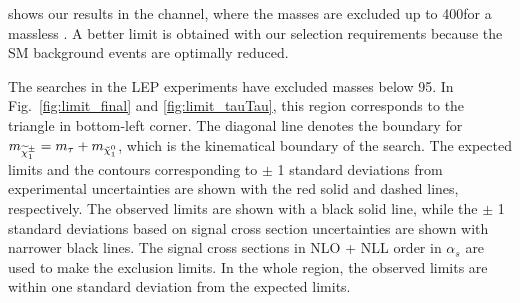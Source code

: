 shows our results in the \tauTau channel, where the \chione masses are excluded up to 400\GeV for a massless \PSGczDo. 
A better limit is obtained with our selection requirements because the SM background events are optimally reduced.

The \sTau searches in the LEP experiments \cite{lepsusy} have excluded masses below 95\GeV. In Fig.~\ref{fig:limit_final} and 
\ref{fig:limit_tauTau}, this region corresponds to the triangle in bottom-left corner. 
The diagonal line denotes the boundary for $m_{\widetilde{\chi}^{\pm}_1} = m_{\tau} + m_{\tilde{\chi}^{0}_1}$, which is the kinematical boundary of the search.
The expected limits and the contours corresponding to $\pm$ 1 standard deviations from experimental uncertainties are shown with the red solid and dashed lines, respectively. 
The observed limits are shown with a black solid line, 
while the $\pm$ 1 standard deviations based on signal cross section uncertainties are shown with narrower black lines.
The signal cross sections in NLO + NLL order in $\alpha_s$ are used to make the exclusion limits.
In the whole region, the observed limits are within one standard deviation from the expected limits.  


